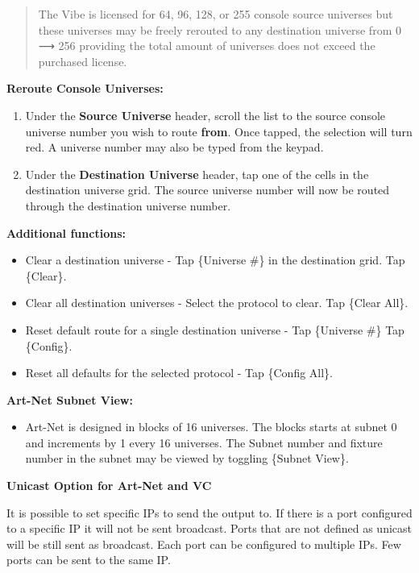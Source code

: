 \documentclass[
]{article}
\providecommand{\tightlist}{%
  \setlength{\itemsep}{0pt}\setlength{\parskip}{0pt}}
\begin{document}
\begin{quote}
The Vibe is licensed for 64, 96, 128, or 255 console source universes but these universes may be freely rerouted to any destination universe from 0 ⟶ 256 providing the total amount of universes does not exceed the purchased license.
\end{quote}

\textbf{Reroute Console Universes:}

\begin{enumerate}
\def\labelenumi{\arabic{enumi}.}
\item
  Under the \textbf{Source Universe} header, scroll the list to the source console universe number you wish to route \textbf{from}. Once tapped, the selection will turn red. A universe number may also be typed from the keypad.
\item
  Under the \textbf{Destination Universe} header, tap one of the cells in the destination universe grid. The source universe number will now be routed through the destination universe number.
\end{enumerate}

\textbf{Additional functions:}

\begin{itemize}
\item
  Clear a destination universe - Tap \{Universe \#\} in the destination grid. Tap \{Clear\}.
\item
  Clear all destination universes - Select the protocol to clear. Tap \{Clear All\}.
\item
  Reset default route for a single destination universe - Tap \{Universe \#\} Tap \{Config\}.
\item
  Reset all defaults for the selected protocol - Tap \{Config All\}.
\end{itemize}

\textbf{Art-Net Subnet View:}

\begin{itemize}
\tightlist
\item
  Art-Net is designed in blocks of 16 universes. The blocks starts at subnet 0 and increments by 1 every 16 universes. The Subnet number and fixture number in the subnet may be viewed by toggling \{Subnet View\}.
\end{itemize}

\textbf{Unicast Option for Art-Net and VC}

It is possible to set specific IPs to send the output to. If there is a port configured to a specific IP it will not be sent broadcast. Ports that are not defined as unicast will be still sent as broadcast. Each port can be configured to multiple IPs. Few ports can be sent to the same IP.
\end{document}
